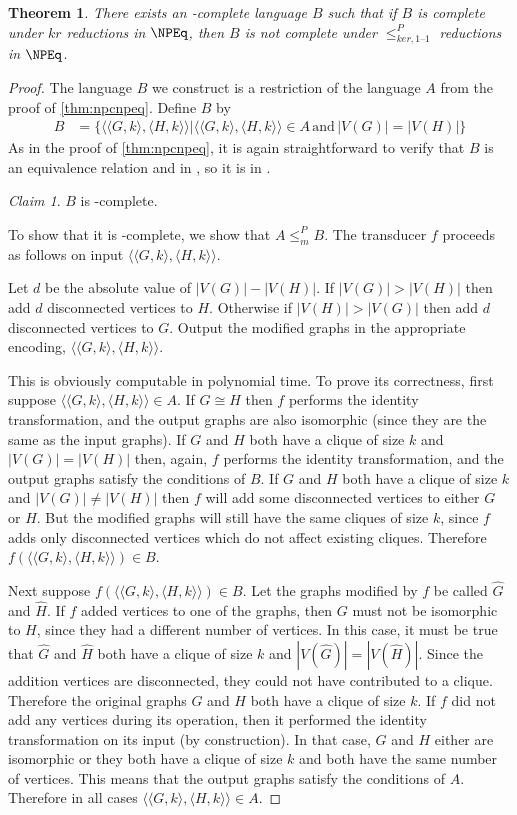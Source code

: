 \documentclass[draft]{article}
\newtheorem{theorem}{Theorem}[section]
\theoremstyle{definition} \newtheorem{openproblem}[openproblem]{Open problem}
\theoremstyle{definition} \newtheorem{definition}[definition]{Definition}
\theoremstyle{remark} \newtheorem{remark}[remark]{Remark}
\newtheorem{claim}{Claim}
\newcommand{\plain}[1]{\,\text{#1}\,} %
\newcommand{\kri}{\leq^{P}_{ker,1\text{--}1}} %
\newcommand{\mor}{\leq^{P}_{m}} %
\newcommand{\pair}[2]{\langle#1,#2\rangle} %
\begin{document}
\begin{theorem}
  There exists an \NP-complete language $B$ such that if $B$ is complete under $kr$ reductions in $\NPEq$, then $B$ is not complete under $\kri$ reductions in $\NPEq$.
\end{theorem}
\begin{proof}
  The language $B$ we construct is a restriction of the language $A$ from the proof of \autoref{thm:npcnpeq}.
  Define $B$ by
  \begin{align*}
    B &= \{\pair{\pair{G}{k}}{\pair{H}{k}}|\pair{\pair{G}{k}}{\pair{H}{k}}\in A \plain{and} |V(G)|=|V(H)|\}
  \end{align*}
  As in the proof of \autoref{thm:npcnpeq}, it is again straightforward to verify that $B$ is an equivalence relation and in \NP, so it is in \NPEq.

  \begin{claim}
    $B$ is \NP-complete.
  \end{claim}
  To show that it is \NP-complete, we show that $A\mor B$.
  The transducer $f$ proceeds as follows on input $\pair{\pair{G}{k}}{\pair{H}{k}}$.

  Let $d$ be the absolute value of $|V(G)|-|V(H)|$.
  If $|V(G)|>|V(H)|$ then add $d$ disconnected vertices to $H$.
  Otherwise if $|V(H)|>|V(G)|$ then add $d$ disconnected vertices to $G$.
  Output the modified graphs in the appropriate encoding, $\pair{\pair{G}{k}}{\pair{H}{k}}$.

  This is obviously computable in polynomial time.
  To prove its correctness, first suppose $\pair{\pair{G}{k}}{\pair{H}{k}}\in A$.
  If $G\cong H$ then $f$ performs the identity transformation, and the output graphs are also isomorphic (since they are the same as the input graphs).
  If $G$ and $H$ both have a clique of size $k$ and $|V(G)|=|V(H)|$ then, again, $f$ performs the identity transformation, and the output graphs satisfy the conditions of $B$.
  If $G$ and $H$ both have a clique of size $k$ and $|V(G)|\neq|V(H)|$ then $f$ will add some disconnected vertices to either $G$ or $H$.
  But the modified graphs will still have the same cliques of size $k$, since $f$ adds only disconnected vertices which do not affect existing cliques.
  Therefore $f(\pair{\pair{G}{k}}{\pair{H}{k}})\in B$.

  Next suppose $f(\pair{\pair{G}{k}}{\pair{H}{k}})\in B$.
  Let the graphs modified by $f$ be called $\hat{G}$ and $\hat{H}$.
  If $f$ added vertices to one of the graphs, then $G$ must not be isomorphic to $H$, since they had a different number of vertices.
  In this case, it must be true that $\hat{G}$ and $\hat{H}$ both have a clique of size $k$ and $|V(\hat{G})|=|V(\hat{H})|$.
  Since the addition vertices are disconnected, they could not have contributed to a clique.
  Therefore the original graphs $G$ and $H$ both have a clique of size $k$.
  If $f$ did not add any vertices during its operation, then it performed the identity transformation on its input (by construction).
  In that case, $G$ and $H$ either are isomorphic or they both have a clique of size $k$ and both have the same number of vertices.
  This means that the output graphs satisfy the conditions of $A$.
  Therefore in all cases $\pair{\pair{G}{k}}{\pair{H}{k}}\in A$.


\end{proof}
\end{document}
